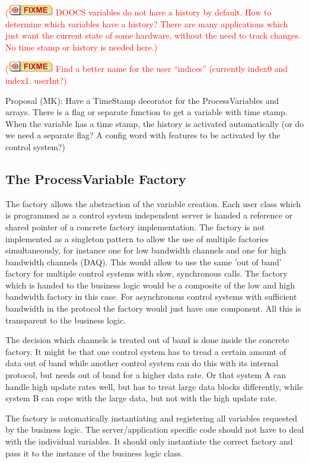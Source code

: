 \documentclass[11pt,a4paper]{scrartcl}
\newcounter{nFixmes}
\newcommand{\fixme}[1]{\addtocounter{nFixmes}{1}\textcolor{red}{(\includegraphics[height=2ex]{fixme} #1)}\xspace}
\begin{document}
\fixme{DOOCS variables do not have a history by default. How to determine which variables 
  have a history? There are many applications which just want the current state of some
  hardware, without the need to track changes. No time stamp or history is needed here.}

\fixme{Find a better name for the user ``indices'' (currently index0 and index1. userInt?}

Proposal (MK): Have a TimeStamp decorator for the ProcessVariables and arrays. There is a flag or
separate function to get a variable with time stamp. When the variable has a time stamp,
the history is activated automatically (or do we need a separate flag? A config word with 
features to be activated by the control system?)

\subsection{The ProcessVariable Factory}

The factory allows the abstraction of the variable creation. Each user class
which is programmed as a control system independent server is handed a
reference or shared pointer of a concrete factory implementation. The factory
is not implemented as a singleton pattern to allow the use of multiple
factories simultaneously, for instance one for low bandwidth channels and one
for high bandwidth channels (DAQ). This would allow to use the same 'out of
band' factory for multiple control systems with slow, synchronous calls. The
factory which is handed to the business logic would be a composite of the low
and high bandwidth factory in this case. 
For asynchronous control systems with sufficient bandwidth in the protocol the
factory would just have one component. All this is transparent to the business
logic.

The decision which channels is treated out of band is done inside the concrete
factory. It might be that one control system has to tread a certain amount of
data out of band while another control system can do this with its internal
protocol, but needs out of band for a higher data rate. Or that system A can
handle high update rates well, but has to treat large data blocks differently,
while system B can cope with the large data, but not with the high update
rate.

The factory is automatically instantiating and registering all variables
requested by the business logic. The server/application specific code should
not have to deal with the individual variables. It should only instantiate the
correct factory and pass it to the instance of the business logic class.
\end{document}
